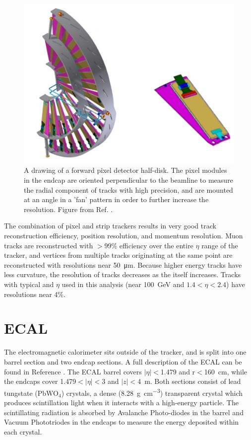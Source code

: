 \begin{figure}[htbp]
    \includegraphics[width=1.1\textwidth]{figures/fpix_drawing.png}
    \centering
	\caption[Schematic of a forward tracker half-disk]{A drawing of a forward pixel detector half-disk. The pixel modules in the endcap are oriented perpendicular to the beamline to measure the radial component of tracks with high precision, and are mounted at an angle in a 'fan' pattern in order to further increase the resolution. Figure from Ref. \cite{pixelUpgrade}.}
    \label{fig:fpixExample}
\end{figure}

The combination of pixel and strip trackers results in very good track reconstruction efficiency, position resolution, and momentum resolution.
Muon tracks are reconstructed with $>99\%$ efficiency over the entire $\eta$ range of the tracker, and vertices from multiple tracks originating at the same point are reconstructed with resolutions near \SI{50}{\micro\meter}.
Because higher energy tracks have less curvature, the \pt resolution of tracks decreases as the \pt itself increases. Tracks with typical \pt and $\eta$ used in this analysis (\pt near \SI{100}{\giga\eV} and $1.4<\eta<2.4$) have resolutions near 4$\%$. 

\section{ECAL}
The electromagnetic calorimeter sits outside of the tracker, and is split into one barrel section and two endcap sections. 
A full description of the ECAL can be found in Reference \cite{ECALtdr}.
The ECAL barrel covers $\lvert\eta\rvert<$1.479 and r$<$\SI{160}{\centi\meter}, while the endcaps cover 1.479$<\lvert\eta\rvert<$3 and $\lvert z \rvert<$\SI{4}{\meter}. 
Both sections consist of lead tungstate (PbWO$_4$) crystals, a dense (\SI{8.28}{\gram\per\cubic\centi\meter}) transparent crystal which produces scintillation light when it interacts with a high-energy particle. 
The scintillating radiation is absorbed by Avalanche Photo-diodes in the barrel and Vacuum Phototriodes in the endcaps to measure the energy deposited within each 
crystal. 

